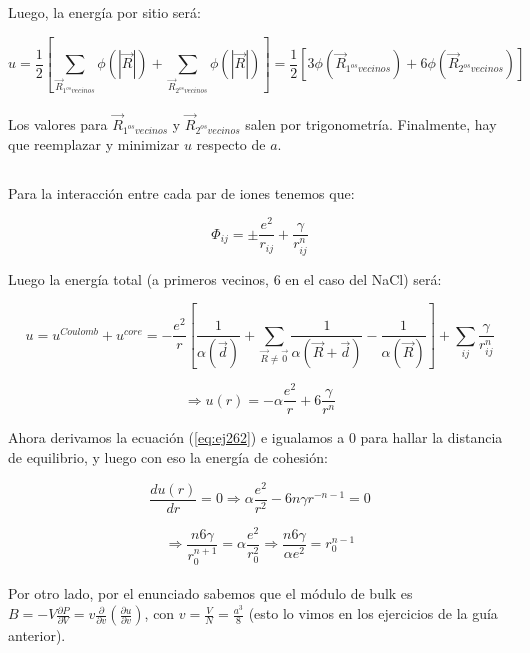 \documentclass[a4paper]{article}
\begin{document}
Luego, la energ\'ia por sitio ser\'a:

$$ u = \frac{1}{2} \left[ \sum_{\vec{R}_{1^{os} vecinos}} \phi(|\vec{R}|) + \sum_{\vec{R}_{2^{os} vecinos}} \phi(|\vec{R}|)\right] = \frac{1}{2} \left[3\phi(\vec{R}_{1^{os} vecinos}) + 6\phi(\vec{R}_{2^{os} vecinos})\right]$$\\

Los valores para $\vec{R}_{1^{os} vecinos}$ y $\vec{R}_{2^{os} vecinos}$ salen por trigonometr\'ia. Finalmente, hay que reemplazar y minimizar $u$ respecto de $a$.

\subsection{}

Para la interacci\'on entre cada par de iones tenemos que:

\begin{equation}
\label{eq:ej26}
\Phi_{ij} = \pm \frac{e^{2}}{r_{ij}} + \frac{\gamma}{r^{n}_{ij}}
\end{equation}

Luego la energ\'ia total (a primeros vecinos, 6 en el caso del NaCl) ser\'a:

$$ u = u^{Coulomb} + u^{core} = -\frac{e^{2}}{r}\left[ \frac{1}{\alpha(\vec{d})} + \sum_{\vec{R} \neq \vec{0}} \frac{1}{\alpha(\vec{R} + \vec{d})}  - \frac{1}{\alpha(\vec{R})} \right] + \sum_{ij} \frac{\gamma}{r^{n}_{ij}}$$

\begin{equation}
\label{eq:ej262}
\Rightarrow u(r) = - \alpha \frac{e^{2}}{r} + 6\frac{\gamma}{r^{n}}
\end{equation}

Ahora derivamos la ecuaci\'on (\ref{eq:ej262}) e igualamos a 0 para hallar la distancia de equilibrio, y luego con eso la energ\'ia de cohesi\'on:

\begin{equation}
\label{eq:ej263}
\frac{du(r)}{dr} = 0 \Rightarrow \alpha \frac{e^{2}}{r^{2}} - 6n\gamma r^{-n-1} = 0
\end{equation}

$$ \Rightarrow \frac{n6 \gamma}{r_{0}^{n+1}} = \alpha \frac{e^{2}}{r_{0}^{2}} \Rightarrow \frac{n6\gamma}{\alpha e^{2}} = r_{0}^{n-1}$$\\

Por otro lado, por el enunciado sabemos que el m\'odulo de bulk es $B = -V \frac{\partial P}{\partial V} = v \frac{\partial}{\partial v}\left( \frac{\partial u}{\partial v}\right)$, con $v = \frac{V}{N} = \frac{a^{3}}{8}$ (esto lo vimos en los ejercicios de la gu\'ia anterior).\\
\end{document}
